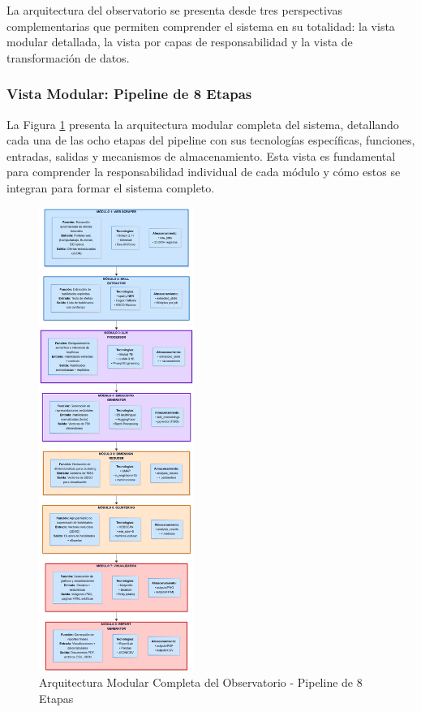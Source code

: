La arquitectura del observatorio se presenta desde tres perspectivas complementarias que permiten comprender el sistema en su totalidad: la vista modular detallada, la vista por capas de responsabilidad y la vista de transformación de datos.

\subsubsection{Vista Modular: Pipeline de 8 Etapas}

La Figura \ref{fig:arquitectura-completa} presenta la arquitectura modular completa del sistema, detallando cada una de las ocho etapas del pipeline con sus tecnologías específicas, funciones, entradas, salidas y mecanismos de almacenamiento. Esta vista es fundamental para comprender la responsabilidad individual de cada módulo y cómo estos se integran para formar el sistema completo.

\begin{figure}[H]
\centering
\includegraphics[width=0.45\textwidth]{diagrams/ArquitecturaGeneral.png}
\caption{Arquitectura Modular Completa del Observatorio - Pipeline de 8 Etapas}
\label{fig:arquitectura-completa}
\end{figure}

